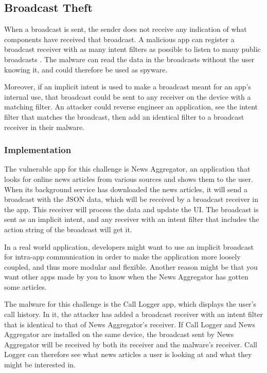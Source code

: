    \subsection{Broadcast Theft}
        \label{subsec:broadcast_theft}
        
    When a broadcast is sent, the sender does not receive any indication of what components have received that broadcast. A malicious app can register a broadcast receiver with as many intent filters as possible to listen to many public broadcasts \cite{2010_icc_paper}. The malware can read the data in the broadcasts without the user knowing it, and could therefore be used as spyware. 
    
    Moreover, if an implicit intent is used to make a broadcast meant for an app’s internal use, that broadcast could be sent to any receiver on the device with a matching filter. An attacker could reverse engineer an application, see the intent filter that matches the broadcast, then add an identical filter to a broadcast receiver in their malware.
    
    \subsubsection{Implementation}
        \label{subsubsec:broadcast_theft_implementation}
        
    The vulnerable app for this challenge is News Aggregator, an application that looks for online news articles from various sources and shows them to the user. When its background service has downloaded the news articles, it will send a broadcast with the JSON data, which will be received by a broadcast receiver in the app. This receiver will process the data and update the UI. The broadcast is sent as an implicit intent, and any receiver with an intent filter that includes the action string of the broadcast will get it.
    
    In a real world application, developers might want to use an implicit broadcast for intra-app communication in order
    to make the application more loosely coupled, and thus more modular and flexible.
    Another reason might be that you want other apps made by you to know when the News
    Aggregator has gotten some articles.

    The malware for this challenge is the Call Logger app, which displays the user's call history. In it, the attacker has added a broadcast receiver with an intent filter that is identical to that of News Aggregator's receiver. If Call Logger and News Aggregator are installed on the same device, the broadcast sent by News Aggregator will be received by both its receiver and the malware's receiver. Call Logger can therefore see what news articles a user is looking at and what they might be interested in.
    
